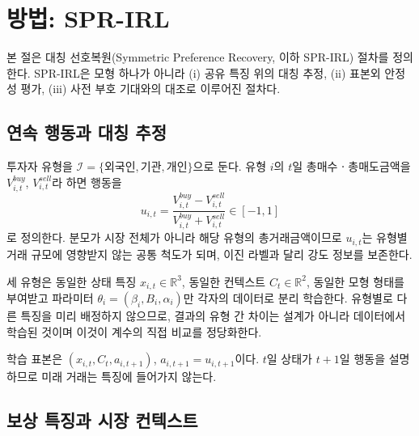 %

\section{방법: SPR-IRL}
\label{sec:method}

본 절은 대칭 선호복원(Symmetric Preference Recovery, 이하 SPR-IRL) 절차를
정의한다. SPR-IRL은 모형 하나가 아니라 (i) 공유 특징 위의 대칭 추정, (ii) 표본외
안정성 평가, (iii) 사전 부호 기대와의 대조로 이루어진 절차다.

\subsection{연속 행동과 대칭 추정}
\label{sec:setup}

투자자 유형을 $\mathcal{I}=\{\text{외국인},\text{기관},\text{개인}\}$으로 둔다.
유형 $i$의 $t$일 총매수ㆍ총매도금액을 $V^{buy}_{i,t}$, $V^{sell}_{i,t}$라 하면
행동을
\begin{equation}
u_{i,t}=\frac{V^{buy}_{i,t}-V^{sell}_{i,t}}
             {V^{buy}_{i,t}+V^{sell}_{i,t}}\in[-1,1]
\label{eq:action}
\end{equation}
로 정의한다. 분모가 시장 전체가 아니라 해당 유형의 총거래금액이므로 $u_{i,t}$는
유형별 거래 규모에 영향받지 않는 공통 척도가 되며, 이진 라벨과 달리 강도 정보를
보존한다.

세 유형은 동일한 상태 특징 $x_{i,t}\in\mathbb{R}^{3}$, 동일한 컨텍스트
$C_t\in\mathbb{R}^{2}$, 동일한 모형 형태를 부여받고 파라미터
$\theta_i=(\beta_i,B_i,\alpha_i)$만 각자의 데이터로 분리 학습한다. 유형별로 다른
특징을 미리 배정하지 않으므로, 결과의 유형 간 차이는 설계가 아니라 데이터에서
학습된 것이며 이것이 계수의 직접 비교를 정당화한다.

학습 표본은 $(x_{i,t},C_t,a_{i,t+1})$, $a_{i,t+1}=u_{i,t+1}$이다. $t$일 상태가
$t+1$일 행동을 설명하므로 미래 거래는 특징에 들어가지 않는다.

\subsection{보상 특징과 시장 컨텍스트}
\label{sec:features}

